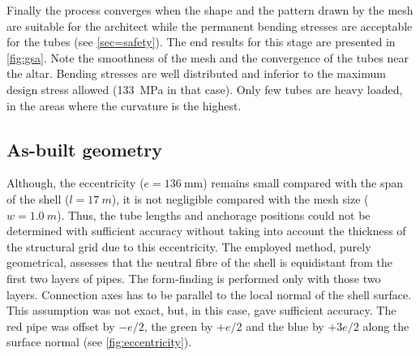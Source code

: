 Finally the process converges when the shape and the pattern drawn by the mesh are suitable for the architect while the permanent bending stresses are acceptable for the tubes (see \cref{sec=safety}). The end results for this stage are presented in \cref{fig:gsa}. Note the smoothness of the mesh and the convergence of the tubes near the altar. Bending stresses are well distributed and inferior to the maximum design stress allowed (\SI{133}{MPa} in that case). Only few tubes are heavy loaded, in the areas where the curvature is the highest.

\subsection{As-built geometry}\label{sec=asbuilt}
Although, the eccentricity ($e = \SI{136}{\mm}$) remains small compared with the span of the shell ($l =\SI{17}{m}$), it is not negligible compared with the mesh size ($w = \SI{1.0}{m}$). Thus, the tube lengths and anchorage positions could not be determined with sufficient accuracy without taking into account the thickness of the structural grid due to this eccentricity. The employed method, purely geometrical, assesses that the neutral fibre of the shell is equidistant from the first two layers of pipes. The form-finding is performed only with those two layers. Connection axes has to be parallel to the local normal of the shell surface. This assumption was not exact, but, in this case, gave sufficient accuracy. The red pipe was offset by $-e/2$, the green by $+e/2$ and the blue by $+3e/2$ along the surface normal (see \cref{fig:eccentricity}).
